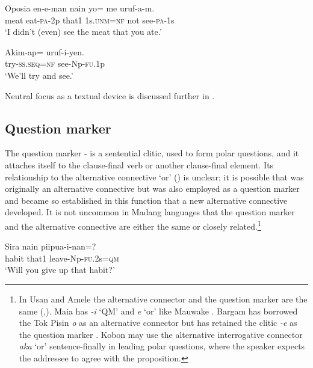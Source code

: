 \ea%
\label{ex:3:x787}
\gll Oposia en-e-man nain yo= me uruf-a-m. \\
meat eat-\textsc{pa}-2p that1 1s.\textsc{unm}=\textsc{nf} not see-\textsc{pa}-1s\\
\glt`I didn't (even) see the meat that you ate.'
\z

\ea%
\label{ex:3:x788}
\gll Akim-ap= uruf-i-yen. \\
try-\textsc{ss}.\textsc{seq}=\textsc{nf} see-Np-\textsc{fu}.1p\\
\glt`We'll try and see.'
\z

Neutral focus as a textual device is discussed further in .

\subsection{Question marker}\label{sec:3.12.8}
{}
The question marker - is a sentential clitic, used to form polar questions, and it attaches itself to the clause-final verb or another clause-final element. Its relationship to the alternative connective  `or' () is unclear; it is possible that  was originally an alternative connective but was also employed as a question marker and became so established in this function that a new alternative connective  developed. It is not uncommon in  Madang languages that the question marker and the alternative connective are either the same or closely related.\footnote{In Usan and Amele the alternative connector and the question marker are the same (\citealt[293]{Reesink1987},\citealt[99]{Roberts1987}). Maia has \textit{-i} `QM' and \textit{e} `or' like Mauwake \citep[83,159]{Hardin2002}. Bargam has borrowed the Tok Pisin \textit{o} as an alternative connector but has retained the clitic \textit{-e} as the question marker \citep[53,122]{Hepner2002}. Kobon may use the alternative interrogative connector \textit{aka} `or' sentence-finally in leading polar questions, where the speaker expects the addressee to agree with the proposition. } 

\ea%
\label{ex:3:x789}
\gll Sira nain piipua-i-nan=? \\
habit that1 leave-Np-\textsc{fu}.2s=\textsc{qm}\\
\glt`Will you give up that habit?'
\z

